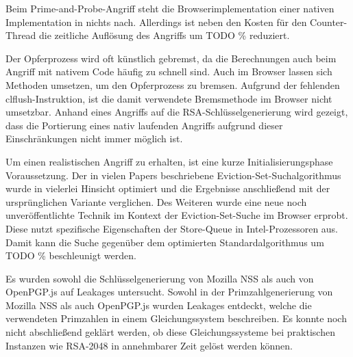 Beim Prime-and-Probe-Angriff steht die Browserimplementation einer nativen Implementation in nichts nach. Allerdings ist neben den Kosten für den Counter-Thread die zeitliche Auflösung des Angriffs um  TODO \% reduziert.

Der Opferprozess wird oft künstlich gebremst, da die Berechnungen auch beim Angriff mit nativem Code häufig zu schnell sind.
Auch im Browser lassen sich Methoden umsetzen, um den Opferprozess zu bremsen. %
Aufgrund der fehlenden clflush-Instruktion, ist die damit verwendete Bremsmethode im Browser nicht umsetzbar.
Anhand eines Angriffs auf die RSA-Schlüsselgenerierung wird gezeigt, dass die Portierung eines nativ laufenden Angriffs aufgrund dieser Einschränkungen nicht immer möglich ist.



Um einen realistischen Angriff zu erhalten, ist eine kurze Initialisierungsphase Voraussetzung.
Der in vielen Papers beschriebene Eviction-Set-Suchalgorithmus \cite{PrimeAndAbort, LiuPrimeAndProbe, DriveByPaper} wurde in vielerlei Hinsicht optimiert und die Ergebnisse anschließend mit der ursprünglichen Variante verglichen. 
Des Weiteren wurde eine neue noch unveröffentlichte Technik im Kontext der Eviction-Set-Suche im Browser erprobt.
Diese nutzt spezifische Eigenschaften der Store-Queue in Intel-Prozessoren aus.
Damit kann die Suche gegenüber dem optimierten Standardalgorithmus um  TODO \% beschleunigt werden.




Es wurden sowohl die Schlüsselgenerierung von Mozilla NSS als auch von OpenPGP.js auf Leakages untersucht. 
Sowohl in der Primzahlgenerierung von Mozilla NSS als auch OpenPGP.js wurden Leakages entdeckt, welche die verwendeten Primzahlen in einem Gleichungssystem beschreiben.
Es konnte noch nicht abschließend geklärt werden, ob diese Gleichungssysteme bei praktischen Instanzen wie RSA-2048 in annehmbarer Zeit gelöst werden können.

